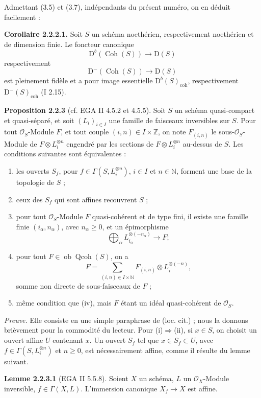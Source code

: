 \documentclass[11pt]{article}
\providecommand{\Qcoh}{\operatorname{Qcoh}}
\providecommand{\Coh}{\operatorname{Coh}}
\providecommand{\Ob}{\operatorname{ob}}
\providecommand{\coh}{\operatorname{coh}}
\begin{document}
Admettant (3.5) et (3.7), indépendants du présent numéro, on en déduit facilement :

\textbf{Corollaire 2.2.2.1.} Soit $S$ un schéma noethérien, respectivement noethérien et de dimension finie. Le foncteur canonique
\[
\mathrm D^b(\Coh(S))\longrightarrow\mathrm D(S)
\]
respectivement
\[
\mathrm D^{-}(\Coh(S))\longrightarrow\mathrm D(S)
\]
est pleinement fidèle et a pour image essentielle $\mathrm D^b(S)_{\coh}$, respectivement $\mathrm D^{-}(S)_{\coh}$ (I 2.15).

\textbf{Proposition 2.2.3} (cf. EGA II 4.5.2 et 4.5.5). Soit $S$ un schéma quasi-compact et quasi-séparé, et soit $(L_i)_{i\in I}$ une famille de faisceaux inversibles sur $S$. Pour tout $\mathcal O_S$-Module $F$, et tout couple $(i,n)\in I\times\mathbb Z$, on note $F_{(i,n)}$ le sous-$\mathcal O_S$-Module de $F\otimes L_i^{\otimes n}$ engendré par les sections de $F\otimes L_i^{\otimes n}$ au-dessus de $S$. Les conditions suivantes sont équivalentes :
\begin{enumerate}[label=(\roman*)]
\item les ouverts $S_f$, pour $f\in\Gamma(S,L_i^{\otimes n})$, $i\in I$ et $n\in\mathbb N$, forment une base de la topologie de $S$ ;
\item ceux des $S_f$ qui sont affines recouvrent $S$ ;
\item pour tout $\mathcal O_S$-Module $F$ quasi-cohérent et de type fini, il existe une famille finie $(i_\alpha,n_\alpha)$, avec $n_\alpha\ge0$, et un épimorphisme
\[
\bigoplus_\alpha L_{i_\alpha}^{\otimes(-n_\alpha)}\longrightarrow F ;
\]
\item pour tout $F\in\Ob\Qcoh(S)$, on a
\[
F=\sum_{(i,n)\in I\times\mathbb N}F_{(i,n)}\otimes L_i^{\otimes(-n)},
\]
somme non directe de sous-faisceaux de $F$ ;
\item même condition que (iv), mais $F$ étant un idéal quasi-cohérent de $\mathcal O_S$.
\end{enumerate}

\emph{Preuve.} Elle consiste en une simple paraphrase de (loc. cit.) ; nous la donnons brièvement pour la commodité du lecteur. Pour (i)$\Rightarrow$(ii), si $x\in S$, on choisit un ouvert affine $U$ contenant $x$. Un ouvert $S_f$ tel que $x\in S_f\subset U$, avec $f\in\Gamma(S,L_i^{\otimes n})$ et $n\ge0$, est nécessairement affine, comme il résulte du lemme suivant.

\textbf{Lemme 2.2.3.1} (EGA II 5.5.8). Soient $X$ un schéma, $L$ un $\mathcal O_X$-Module inversible, $f\in\Gamma(X,L)$. L'immersion canonique $X_f\to X$ est affine.
\end{document}
